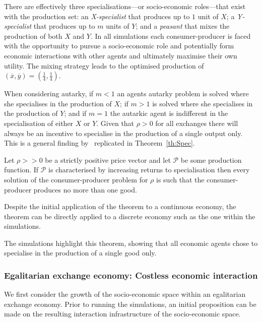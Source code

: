 There are effectively three specialisations---or socio-economic roles---that exist with the production set: an \emph{X-specialist} that produces up to $1$ unit of $X$; a \emph{Y-specialist} that produces up to $m$ units of $Y$; and a \emph{peasant} that mixes the production of both $X$ and $Y$. In all simulations each consumer-producer is faced with the opportunity to pursue a socio-economic role and potentially form economic interactions with other agents and ultimately maximise their own utility. The mixing strategy leads to the optimised production of $(\overline{x},\overline{y})=\left( \frac{1}{4},\frac{1}{4} \right)$.

When considering autarky, if $m<1$ an agents autarky problem is solved where she specialises in the production of $X$; if $m>1$ is solved where she specialises in the production of $Y$; and if $m=1$ the autarkic agent is indifferent in the specialisation of either $X$ or $Y$. Given that $\rho>0$ for all exchanges there will always be an incentive to specialise in the production of a single output only. This is a general finding by~\citet{Gilles2016} replicated in Theorem~\ref{th:Spec}. 

\begin{theorem} \label{th:Spec}
Let $\rho >> 0$ be a strictly positive price vector and let $\mathcal{P}$ be some production function. If $\mathcal{P}$ is characterised by increasing returns to specialisation then every solution of the consumer-producer problem for $\rho$ is such that the consumer-producer produces no more than one good.
\end{theorem}

Despite the initial application of the theorem to a continuous economy, the theorem can be directly applied to a discrete economy such as the one within the simulations.

The simulations highlight this theorem, showing that all economic agents chose to specialise in the production of a single good only.

\subsubsection{Egalitarian exchange economy: Costless economic interaction}

We first consider the growth of the socio-economic space within an egalitarian exchange economy. Prior to running the simulations, an initial proposition can be made on the resulting interaction infrastructure of the socio-economic space.

